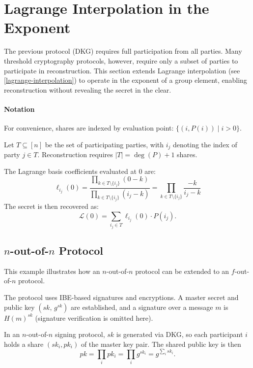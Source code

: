\section{Lagrange Interpolation in the Exponent}\label{lagrange-in-exponent} %
The previous protocol (DKG) requires full participation from all parties.
Many threshold cryptography protocols, however, require only a subset of parties to participate in reconstruction.
This section extends Lagrange interpolation (see \autoref{lagrange-interpolation}) to operate in the exponent of a group element,
enabling reconstruction without revealing the secret in the clear.

\paragraph{Notation}
\begin{remark}
  For convenience, shares are indexed by evaluation point: $\{(i, P(i)) \mid i > 0\}$.
\end{remark}

Let $T \subseteq [n]$ be the set of participating parties, with $i_j$ denoting the index of party $j \in T$.
Reconstruction requires $|T| = \deg(P) + 1$ shares.

The Lagrange basis coefficients evaluated at $0$ are:
\[
 \ell_{i_j}(0) = \frac{
 \prod_{k\in T \setminus \{i_j\}}(0-k)
}{
  \prod_{k\in T \setminus \{i_j\}}(i_j - k)
} = \prod_{k\in T \setminus \{i_j\}} \frac{-k}{i_j - k}
\]
The secret is then recovered as:
\[\mathcal{L}(0) = \sum_{i_j \in T} \ell_{i_j}(0) \cdot P(i_j). \]

\subsection{\texorpdfstring{$n$-out-of-$n$}{n-out-of-n} Protocol}
This example illustrates how an $n$-out-of-$n$ protocol can be extended to an $f$-out-of-$n$ protocol.

The protocol uses IBE-based signatures and encryptions.
A master secret and public key $(sk,\, g^{sk})$ are established, and a signature over a message $m$ is $H(m)^{sk}$ (signature verification is omitted here).

In an $n$-out-of-$n$ signing protocol, $sk$ is generated via DKG, so each participant $i$ holds a share $(sk_i, pk_i)$ of the master key pair.
The shared public key is then \[pk = \prod_{i} pk_i = \prod_{i} g^{sk_i} = g^{\sum_{i} sk_i}.\]


